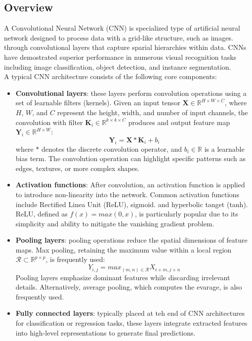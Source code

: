 \documentclass[target=bach,aauheader=,style=]{thud}
\begin{document}
\subsection{Overview}
A Convolutional Neural Network (CNN) is specialized type of artificial neural network designed to process data with a grid-like structure, such as images. through convolutional layers that capture sparial hierarchies within data. CNNs have demostrated superior performance in numerous visual recognition tasks including image classification, object detection, and instance segmentation.\\
A typical CNN architecture consists of the following core components:
\begin{itemize}
    \item \textbf{Convolutional layers}: these layers perform convolution operations using a set of learnable filters (kernels). Given an input tensor $\mathbf{X}\in\mathbb{R}^{H\times W\times C}$, where $H$, $W$, and $C$ represent the height, width, and number of input channels, the convolution with filter $\mathbf{K}_i\in \mathbb{R}^{k\times k\times C}$ produces and output feature map $\mathbf{Y}_i\in \mathbb{R}^{H\times W}:$
    \begin{equation}
        \mathbf{Y}_i=\mathbf{X}*\mathbf{K}_i+b_i
    \end{equation}
    where $*$ denotes the discrete convolution operator, and $b_i\in\mathbb{R}$ is a learnable bias term. The convolution operation can highlight specific patterns such as edges, textures, or more complex shapes.
    \item \textbf{Activation functions}: After convolution, an activation function is applied to introduce non-linearity into the network. Common activation functions include Rectified Linea Unit (ReLU), sigmoid. and hyperbolic tanget (tanh). ReLU, defined as $f(x)=max(0,x)$, is particularly popular due to its simplicity and ability to mitigate the vanishing gradient problem.
    \item \textbf{Pooling layers}: pooling operations reduce the spatial dimensions of feature maps. Max pooling, retaining the maximum value within a local region $\mathcal{R}\subset \mathbb{R}^{p\times p}$, is frequently used:
    \begin{equation}
        Y_{i,j}=max_{(m,n)\in\mathcal{R}}X_{i+m,j+n}
    \end{equation}
    Pooling layers emphasize dominant features while discarding irrelevant details. Alternatively, average pooling, which computes the evarage, is also frequently used.
    \item \textbf{Fully connected layers}: typically placed at teh end of CNN architectures for classification or regression tasks, these layers integrate extracted features into high-level representations to generate final predictions.
\end{itemize}
\end{document}
